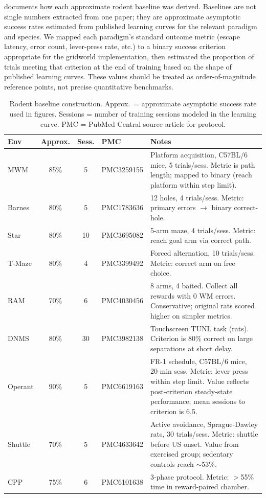 \documentclass[letterpaper]{article}
\begin{document}
 documents how each approximate rodent baseline was derived.
Baselines are not single numbers extracted from one paper; they are approximate asymptotic success rates estimated from published learning curves for the relevant paradigm and species.
We mapped each paradigm's standard outcome metric (escape latency, error count, lever-press rate, etc.) to a binary success criterion appropriate for the gridworld implementation, then estimated the proportion of trials meeting that criterion at the end of training based on the shape of published learning curves.
These values should be treated as order-of-magnitude reference points, not precise quantitative benchmarks.

\begin{table}[t]
\centering
\caption{Rodent baseline construction. Approx.\ = approximate asymptotic success rate used in figures. Sessions = number of training sessions modeled in the learning curve. PMC = PubMed Central source article for protocol.}
\label{tab:baselines}
\footnotesize
\begin{tabular}{@{}lcclp{10cm}@{}}
\toprule
\textbf{Env} & \textbf{Approx.} & \textbf{Sess.} & \textbf{PMC} & \textbf{Notes} \\
\midrule
MWM & 85\% & 5 & PMC3259155 & Platform acquisition, C57BL/6 mice, 5 trials/sess. Metric is path length; mapped to binary (reach platform within step limit). \\[2pt]
Barnes & 80\% & 5 & PMC1783636 & 12 holes, 4 trials/sess. Metric: primary errors $\to$ binary correct-hole. \\[2pt]
Star & 80\% & 10 & PMC3695082 & 5-arm maze, 4 trials/sess. Metric: reach goal arm via correct path. \\[2pt]
T-Maze & 80\% & 4 & PMC3399492 & Forced alternation, 10 trials/sess. Metric: correct arm on free choice. \\[2pt]
RAM & 70\% & 6 & PMC4030456 & 8 arms, 4 baited. Collect all rewards with 0 WM errors. Conservative; original rats scored higher on simpler metrics. \\[2pt]
DNMS & 80\% & 30 & PMC3982138 & Touchscreen TUNL task (rats). Criterion is 80\% correct on large separations at short delay. \\[2pt]
Operant & 90\% & 5 & PMC6619163 & FR-1 schedule, C57BL/6 mice, 20-min sess. Metric: lever press within step limit. Value reflects post-criterion steady-state performance; mean sessions to criterion is 6.5. \\[2pt]
Shuttle & 70\% & 5 & PMC4633642 & Active avoidance, Sprague-Dawley rats, 30 trials/sess. Metric: shuttle before US onset. Value from exercised group; sedentary controls reach $\sim$53\%. \\[2pt]
CPP & 75\% & 6 & PMC6101638 & 3-phase protocol. Metric: $>$55\% time in reward-paired chamber. \\
\bottomrule
\end{tabular}
\end{table}
\end{document}
